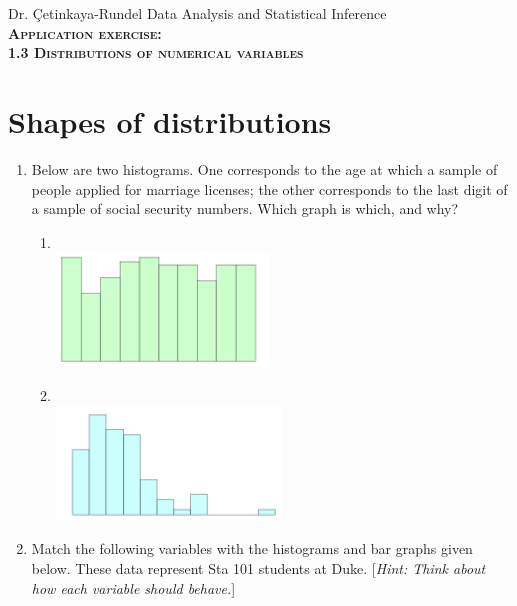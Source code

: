 \documentclass[11pt]{article}
\newcommand{\ttl}[1]{ \textsc{{\LARGE \textbf{{\color{oiB} #1} } }}}
\begin{document}
Dr. \c{C}etinkaya-Rundel \hfill Data Analysis and Statistical Inference \\

\ttl{Application exercise: \\
1.3 Distributions of numerical variables} 

\section{Shapes of distributions}

\begin{enumerate}

\item Below are two histograms. One corresponds to the age at which a sample of people applied for marriage licenses; the other corresponds to the last digit of a sample of social security numbers. Which graph is which, and why?

\begin{multicols}{2}

\begin{enumerate}

\item $\:$ \\
\includegraphics[height=1.2in]{last_digit_SSN}

\item $\:$ \\
\includegraphics[height=1.2in]{age_mar_lic}

\end{enumerate}

\end{multicols}

%

\item Match the following variables with the histograms and bar graphs given below. These data represent Sta 101 students at Duke. [\textit{Hint: Think about how each variable should behave.}]


\end{enumerate}
\end{document}
